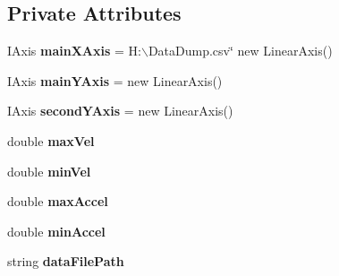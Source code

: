 \subsection*{Private Attributes}
\begin{DoxyCompactItemize}
\item 
\hypertarget{class_data_dump_processor_1_1_view_model_aae11692c167d5b516f4e3756315cce53}{I\-Axis {\bfseries main\-X\-Axis} = H\-:$\backslash$\-Data\-Dump.\-csv\char`\"{} new Linear\-Axis()}\label{class_data_dump_processor_1_1_view_model_aae11692c167d5b516f4e3756315cce53}

\item 
\hypertarget{class_data_dump_processor_1_1_view_model_a77e4d3b05b8feea540d97672efe027b4}{I\-Axis {\bfseries main\-Y\-Axis} = new Linear\-Axis()}\label{class_data_dump_processor_1_1_view_model_a77e4d3b05b8feea540d97672efe027b4}

\item 
\hypertarget{class_data_dump_processor_1_1_view_model_a34d8a92a5e738c604927ed00aa00532a}{I\-Axis {\bfseries second\-Y\-Axis} = new Linear\-Axis()}\label{class_data_dump_processor_1_1_view_model_a34d8a92a5e738c604927ed00aa00532a}

\item 
\hypertarget{class_data_dump_processor_1_1_view_model_a9da76999d23b755ab1ba591324102186}{double {\bfseries max\-Vel}}\label{class_data_dump_processor_1_1_view_model_a9da76999d23b755ab1ba591324102186}

\item 
\hypertarget{class_data_dump_processor_1_1_view_model_a9c6059ab43aa1676b6054cde03bac27e}{double {\bfseries min\-Vel}}\label{class_data_dump_processor_1_1_view_model_a9c6059ab43aa1676b6054cde03bac27e}

\item 
\hypertarget{class_data_dump_processor_1_1_view_model_a1348c430a0407c9830beedc1f87f6de4}{double {\bfseries max\-Accel}}\label{class_data_dump_processor_1_1_view_model_a1348c430a0407c9830beedc1f87f6de4}

\item 
\hypertarget{class_data_dump_processor_1_1_view_model_a145397314e41efec6c5dd3351dddd300}{double {\bfseries min\-Accel}}\label{class_data_dump_processor_1_1_view_model_a145397314e41efec6c5dd3351dddd300}

\item 
\hypertarget{class_data_dump_processor_1_1_view_model_aa375b35f91ca0dd3a9226903e8c26dbb}{string {\bfseries data\-File\-Path}}\label{class_data_dump_processor_1_1_view_model_aa375b35f91ca0dd3a9226903e8c26dbb}


\end{DoxyCompactItemize}
